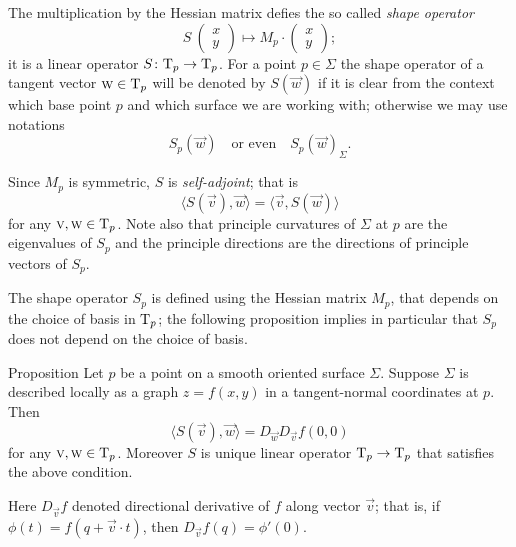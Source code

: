 The multiplication by the Hessian matrix defies the so called \emph{shape operator}
\[S\:(\begin{smallmatrix}
x\\y
\end{smallmatrix})
\mapsto
M_p\cdot(\begin{smallmatrix}
x\\y
\end{smallmatrix});\]
it is a linear operator $S\colon\mathrm{T}_p\to \mathrm{T}_p$.
For a point $p\in \Sigma$ the shape operator of a tangent vector $\textsc w\in \mathrm{T}_p$ will be denoted by $S(\vec w)$ if it is clear from the context which base point $p$ and which surface we are working with;
otherwise we may use notations 
\[S_p(\vec w)\quad\text{or even}\quad S_p(\vec w)_\Sigma.\]


Since $M_p$ is symmetric, $S$ is \emph{self-adjoint}; that is
\[\langle S(\vec v),\vec w\rangle=\langle \vec v,S(\vec w)\rangle\]
for any $\textsc v,\textsc w\in\mathrm{T}_p$.
Note also that principle curvatures of $\Sigma$ at $p$ are the eigenvalues of $S_p$ and the principle directions are the directions of principle vectors of $S_p$.

The shape operator $S_p$ is defined using the Hessian matrix $M_p$, that depends on the choice of basis in $\mathrm{T}_p$;
the following proposition implies in particular that $S_p$ does not depend on the choice of basis. 

\begin{thm}{Proposition}\label{prop:shape=D2}
Let $p$ be a point on a smooth oriented surface $\Sigma$.
Suppose $\Sigma$ is described locally as a graph $z=f(x,y)$ in a tangent-normal coordinates at $p$.
Then
\[\langle S(\vec v),\vec w\rangle=D_{\vec w}D_{\vec v}f(0,0)\]
for any $\textsc v,\textsc w\in\mathrm{T}_p$.
Moreover $S$ is unique linear operator $\mathrm{T}_p\to\mathrm{T}_p$ that satisfies the above condition.
\end{thm}

Here $D_{\vec v}f$ denoted directional derivative of $f$ along vector $\vec v$;
that is, if $\phi(t)=f(q+\vec v\cdot t)$, then $D_{\vec v}f(q)=\phi'(0)$.

